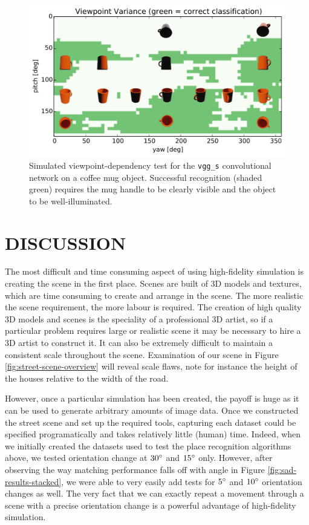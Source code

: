 \documentclass[letterpaper, 10 pt, conference]{ieeeconf}  %
\begin{document}
\begin{figure}[t]
    \includegraphics[width=\linewidth]{object_recognition.pdf}
    \caption{Simulated viewpoint-dependency test for the \texttt{vgg\_s} convolutional network \cite{Chatfield14} on a coffee mug object. Successful recognition (shaded green) requires the mug handle to be clearly visible and the object to be well-illuminated.}
    \label{fig:obj-recognition}
\end{figure}


\section{DISCUSSION} \label{sec:discussion}

The most difficult and time consuming aspect of using high-fidelity simulation is creating the scene in the first place. Scenes are built of 3D models and textures, which are time consuming to create and arrange in the scene. The more realistic the scene requirement, the more labour is required. The creation of high quality 3D models and scenes is the speciality of a professional 3D artist, so if a particular problem requires large or realistic scene it may be necessary to hire a 3D artist to construct it. It can also be extremely difficult to maintain a consistent scale throughout the scene. Examination of our scene in Figure \ref{fig:street-scene-overview} will reveal scale flaws, note for instance the height of the houses relative to the width of the road.

However, once a particular simulation has been created, the payoff is huge as it can be used to generate arbitrary amounts of image data. Once we constructed the street scene and set up the required tools, capturing each dataset could be specified programatically and takes relatively little (human) time. Indeed, when we initially created the  datasets used to test the place recognition algorithms above, we tested orientation change at $30\degree$ and $15\degree$ only. However, after observing the way matching performance falls off with angle in Figure \ref{fig:sad-results-stacked}, we were able to very easily add tests for $5\degree$ and $10\degree$ orientation changes as well. The very fact that we can exactly repeat a movement through a scene with a precise orientation change is a powerful advantage of high-fidelity simulation.
\end{document}
